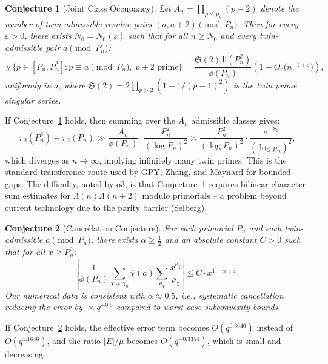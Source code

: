 \documentclass[11pt]{article}
\newtheorem{conjecture}{Conjecture}
\begin{document}
\begin{conjecture}[Joint Class Occupancy]\label{conj:joint}
Let $A_n = \prod_{p \leq p_n} (p-2)$ denote the number of twin-admissible
residue pairs $(a, a+2) \pmod{P_n}$. Then for every $\varepsilon > 0$,
there exists $N_0 = N_0(\varepsilon)$ such that for all $n \geq N_0$ and
every twin-admissible pair $a \pmod{P_n}$:
\begin{equation}
\#\{p \in [P_n, P_n^2] : p \equiv a \!\pmod{P_n},\; p+2 \text{ prime}\}
= \frac{\mathfrak{S}(2)\,\mathrm{li}(P_n^2)}{\phi(P_n)}
\left(1 + O_\varepsilon\bigl(n^{-1+\varepsilon}\bigr)\right),
\end{equation}
uniformly in $a$, where $\mathfrak{S}(2) = 2\prod_{p>2}(1 - 1/(p-1)^2)$
is the twin prime singular series.
\end{conjecture}

If Conjecture~\ref{conj:joint} holds, then summing over the $A_n$
admissible classes gives:
\begin{equation}
\pi_2(P_n^2) - \pi_2(P_n) \gg \frac{A_n}{\phi(P_n)} \cdot
\frac{P_n^2}{(\log P_n)^2}
\asymp \frac{P_n^2}{(\log P_n)^2} \cdot \frac{e^{-2\gamma}}{(\log p_n)^2},
\end{equation}
which diverges as $n \to \infty$, implying infinitely many twin primes.
This is the standard transference route used by GPY, Zhang, and Maynard
for bounded gaps. The difficulty, noted by o3, is that
Conjecture~\ref{conj:joint} requires bilinear character sum estimates for
$\Lambda(n)\Lambda(n+2)$ modulo primorials -- a problem beyond current
technology due to the parity barrier (Selberg).

\begin{conjecture}[Cancellation Conjecture]\label{conj:cancellation}
For each primorial $P_n$ and each twin-admissible $a \pmod{P_n}$,
there exists $\alpha \geq \tfrac{1}{2}$ and an absolute constant
$C > 0$ such that for all $x \geq P_n^2$:
\begin{equation}
\left|\frac{1}{\phi(P_n)} \sum_{\chi \neq \chi_0}
\overline{\chi}(a) \sum_{\rho_\chi} \frac{x^{\rho_\chi}}{\rho_\chi}\right|
\leq C \cdot x^{1 - \alpha + \varepsilon}.
\end{equation}
Our numerical data is consistent with $\alpha \approx 0.5$, i.e., systematic
cancellation reducing the error by $\asymp q^{-0.5}$ compared to worst-case
subconvexity bounds.
\end{conjecture}

If Conjecture~\ref{conj:cancellation} holds, the effective error term
becomes $O(q^{0.6646})$ instead of $O(q^{1.1646})$, and the ratio
$|E|/\mu$ becomes $O(q^{-0.3354})$, which is small and decreasing.
\end{document}
